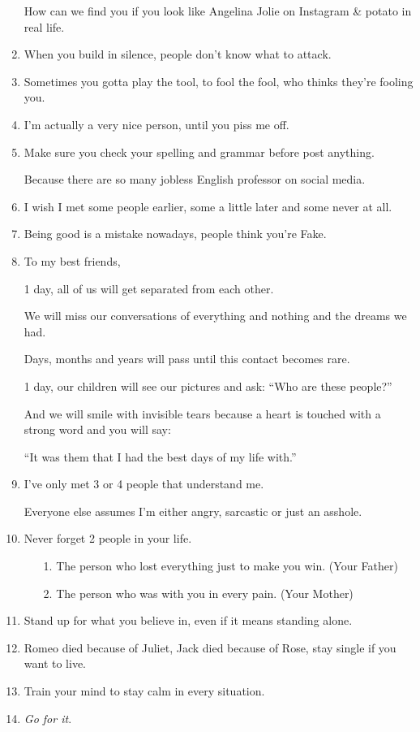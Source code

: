 \documentclass{article}
\begin{document}
\begin{enumerate}
	How can we find you if you look like Angelina Jolie on Instagram \& potato in real life.
	\item When you build in silence, people don't know what to attack.
	\item Sometimes you gotta play the tool, to fool the fool, who thinks they're fooling you.
	\item I'm actually a very nice person, until you piss me off.
	\item Make sure you check your spelling and grammar before post anything.
	
	Because there are so many jobless English professor on social media.
	\item I wish I met some people earlier, some a little later and some never at all.
	\item Being good is a mistake nowadays, people think you're Fake.
	\item To my best friends,
	
	1 day, all of us will get separated from each other.
	
	We will miss our conversations of everything and nothing and the dreams we had.
	
	Days, months and years will pass until this contact becomes rare.
	
	1 day, our children will see our pictures and ask: ``Who are these people?''
	
	And we will smile with invisible tears because a heart is touched with a strong word and you will say:
	
	``It was them that I had the best days of my life with.''
	\item I've only met 3 or 4 people that understand me.
	
	Everyone else assumes I'm either angry, sarcastic or just an asshole.
	\item Never forget 2 people in your life.
	\begin{itemize}
		\item[1.] The person who lost everything just to make you win. (Your Father)
		\item[2.] The person who was with you in every pain. (Your Mother)
	\end{itemize}
	\item Stand up for what you believe in, even if it means standing alone.
	\item Romeo died because of Juliet, Jack died because of Rose, stay single if you want to live.
	\item Train your mind to stay calm in every situation.
	\item \textit{Go for it}.
	

\end{enumerate}
\end{document}
